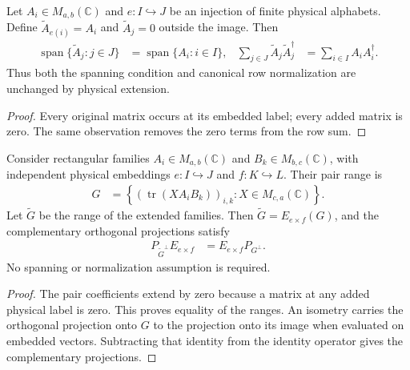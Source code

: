 \begin{lemma}
    \label{lem:varying_physical_extension_span_row}
    \leanok
    Let $A_i\in M_{a,b}(\mathbb C)$ and $e:I\hookrightarrow J$ be an injection
    of finite physical alphabets. Define $\widetilde A_{e(i)}=A_i$ and
    $\widetilde A_j=0$ outside the image. Then
    \begin{align}
        \operatorname{span}\{\widetilde A_j:j\in J\}
         & =\operatorname{span}\{A_i:i\in I\},
         & \sum_{j\in J}\widetilde A_j\widetilde A_j^\dagger
         & =\sum_{i\in I}A_iA_i^\dagger.
    \end{align}
    Thus both the spanning condition and canonical row normalization are
    unchanged by physical extension.
\end{lemma}
\begin{proof}\leanok
    Every original matrix occurs at its embedded label; every added matrix
    is zero. The same observation removes the zero terms from the row sum.
\end{proof}

\begin{lemma}
    \label{lem:varying_physical_pair_projection_transport}
    \leanok
    Consider rectangular families $A_i\in M_{a,b}(\mathbb C)$ and
    $B_k\in M_{b,c}(\mathbb C)$, with independent physical embeddings
    $e:I\hookrightarrow J$ and $f:K\hookrightarrow L$. Their pair range is
    \begin{align}
        G & =\left\{\left(\operatorname{tr}(XA_iB_k)\right)_{i,k}:
        X\in M_{c,a}(\mathbb C)\right\}.
    \end{align}
    Let $\widetilde G$ be the range of the extended families. Then
    $\widetilde G=E_{e\times f}(G)$, and the complementary orthogonal
    projections satisfy
    \begin{align}
        P_{\widetilde G^\perp}E_{e\times f}
         & =E_{e\times f}P_{G^\perp}.
    \end{align}
    No spanning or normalization assumption is required.
\end{lemma}
\begin{proof}\leanok
    The pair coefficients extend by zero because a matrix at any added
    physical label is zero. This proves equality of the ranges.
    An isometry carries the orthogonal projection onto $G$ to the projection
    onto its image when evaluated on embedded vectors. Subtracting that
    identity from the identity operator gives the complementary projections.
\end{proof}


